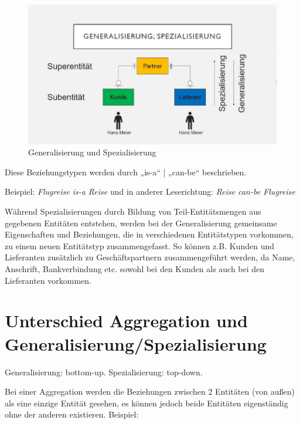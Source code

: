 \begin{figure}[H]
    \centering
    \includegraphics[width=.8\textwidth]{Content/images/modellierung/general.png}
    \caption{Generalisierung und Spezialisierung}
    \label{fig:modellierung:general}
\end{figure}

Diese Beziehungstypen werden durch „is-a“ | „can-be“ beschrieben.

Beispiel:
\textit{Flugreise is-a Reise} \newline
 	und in anderer Leserichtung: \newline
\textit{Reise can-be Flugreise}

Während Spezialisierungen durch Bildung von Teil-Entitätsmengen aus gegebenen Entitäten entstehen, werden bei der Generalisierung gemeinsame Eigenschaften und Beziehungen, die in verschiedenen Entitätstypen vorkommen, zu einem neuen Entitätstyp zusammengefasst. So können z.B. Kunden und Lieferanten zusätzlich zu Geschäftspartnern zusammengeführt werden, da Name, Anschrift, Bankverbindung etc. sowohl bei den Kunden als auch bei den Lieferanten vorkommen.

\section{Unterschied Aggregation und Generalisierung/Spezialisierung}

Generalisierung: bottom-up. \newline
Spezialisierung: top-down.

Bei einer Aggregation werden die Beziehungen zwischen 2 Entitäten (von außen) als eine einzige Entität gesehen, es können jedoch beide Entitäten eigenständig ohne der anderen existieren. 
Beispiel: 

